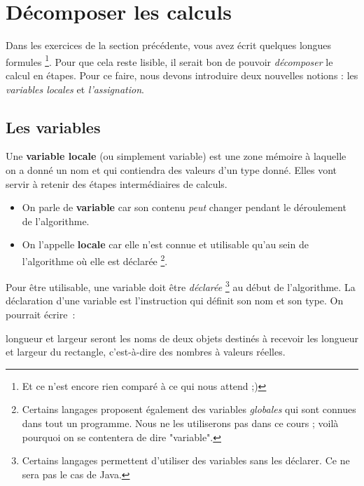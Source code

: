 	\section{Décomposer les calculs}
	
		Dans les exercices de la section précédente,
		vous avez écrit quelques longues formules%
		\footnote{%
			Et ce n'est encore rien comparé à ce qui nous attend ;)%
		}.
		Pour que cela reste lisible,
		il serait bon de pouvoir \emph{décomposer}
		le calcul en étapes.
		Pour ce faire, nous devons introduire deux nouvelles notions :
		les \emph{variables locales} et \emph{l'assignation}.
		
		\subsection{Les variables}
		
			Une \textbf{variable locale} (ou simplement variable)
			est une zone mémoire à laquelle on a donné un nom
			et qui contiendra des valeurs d'un type donné.
			Elles vont servir à retenir des étapes intermédiaires
			de calculs.
			\begin{itemize}
			\item
				On parle de \textbf{variable}
				car son contenu \emph{peut} changer
				pendant le déroulement de l'algorithme.
			\item
				On l'appelle \textbf{locale}
				car elle n'est connue et utilisable qu'au sein
				de l'algorithme où elle est déclarée%
				\footnote{%
					Certains langages proposent également des variables
					\emph{globales} qui sont connues dans tout un programme.
					Nous ne les utiliserons pas dans ce cours ;
					voilà pourquoi on se contentera de dire "variable".%
				}.
			\end{itemize}		
			Pour être utilisable, 
			une variable doit être \emph{déclarée}%
			\footnote{%
				Certains langages permettent 
				d'utiliser des variables sans les déclarer.
				Ce ne sera pas le cas de Java.
			}
			au début de l'algorithme. 	
			La déclaration d’une variable 
			est l’instruction qui définit son nom et son type. 
			On pourrait écrire~:
	
			\begin{LDA}
				\Stmt longueur et largeur seront les noms de deux objets destinés à recevoir
				\Stmt les longueur et largeur du rectangle, c’est-à-dire des nombres à valeurs réelles.
			\end{LDA}
			
